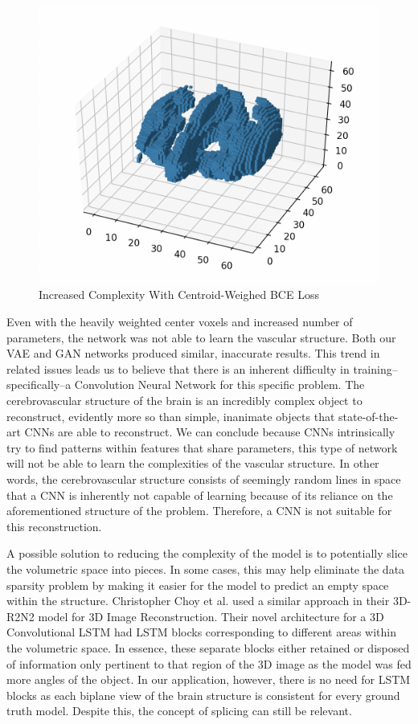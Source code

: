 \documentclass[conference, 10pt]{IEEEtran}
\begin{document}
\begin{figure}[h]
    \centering
    \includegraphics[scale=0.2]{custom_loss.png}
    \caption{Increased Complexity With Centroid-Weighed BCE Loss}
\end{figure}

Even with the heavily weighted center voxels and increased number of parameters,
the network was not able to learn the vascular structure. Both our VAE and GAN
networks produced similar, inaccurate results. This trend in related issues
leads us to believe that there is an inherent difficulty in training--
specifically--a Convolution Neural Network for this specific problem. The
cerebrovascular structure of the brain is an incredibly complex object to
reconstruct, evidently more so than simple, inanimate objects that
state-of-the-art CNNs are able to reconstruct. We can conclude because CNNs 
intrinsically try to find patterns within features that share parameters, this
type of network will not be able to learn the complexities of the vascular
structure. In other words, the cerebrovascular structure consists of seemingly 
random lines in space that a CNN is inherently not capable of learning because 
of its reliance on the aforementioned structure of the problem. Therefore, a 
CNN is not suitable for this reconstruction.


A possible solution to reducing the complexity of the model is to potentially slice the volumetric space into pieces. In some cases, this may help eliminate the data sparsity problem by making it easier for the model to predict an empty space within the structure. Christopher Choy et al. used a similar approach in their 3D-R2N2 model for 3D Image Reconstruction. Their novel architecture for a 3D Convolutional LSTM had LSTM blocks corresponding to different areas within the volumetric space. In essence, these separate blocks either retained or disposed of information only pertinent to that region of the 3D image as the model was fed more angles of the object. In our application, however, there is no need for LSTM blocks as each biplane view of the brain structure is consistent for every ground truth model. Despite this, the concept of splicing can still be relevant.
\end{document}

